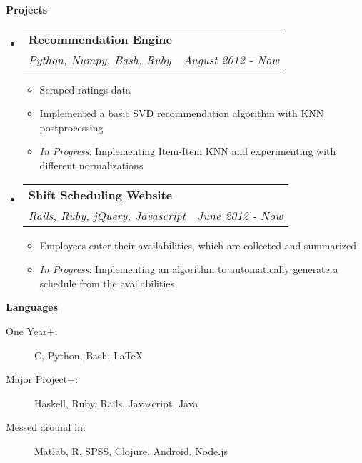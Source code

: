 \documentclass[letterpaper,11pt]{article}
\makeatletter
\newcommand{\resitem}[1]{\item #1 \vspace{-2pt}}
\newcommand{\resheading}[1]{{\large {\textbf{#1 \vphantom{p\^{E}}}}}}
\newcommand{\ressubheading}[4]{
\begin{tabular*}{6.5in}{l@{\extracolsep{\fill}}r}
		\textbf{#1} & #2 \\
			    \textit{#3} & \textit{#4} \\
\end{tabular*}\vspace{-6pt}}
\makeatother
\begin{document}
\resheading{Projects}
\begin{itemize}
\item[]
	\ressubheading{Recommendation Engine}{}{Python, Numpy, Bash, Ruby}{August 2012 - Now}
	\begin{itemize}
		\resitem{Scraped ratings data}
				\resitem{Implemented a basic SVD recommendation algorithm with KNN postprocessing}
						  \resitem{\textit{In Progress}: Implementing Item-Item KNN and experimenting with different normalizations}
								       \end{itemize}

\item[]
	\ressubheading{Shift Scheduling Website}{}{Rails, Ruby, jQuery, Javascript}{June 2012 - Now}
	\begin{itemize}
		\resitem{Employees enter their availabilities, which are collected and summarized}
				  \resitem{\textit{In Progress}: Implementing an algorithm to automatically generate a schedule from the availabilities}
				  \end{itemize}

\end{itemize}

\resheading{Languages}

\begin{description}
\item[One Year+:]
C, Python, Bash, \LaTeX
\item[Major Project+:]
Haskell, Ruby, Rails, Javascript, Java
\item[Messed around in:]
Matlab, R, SPSS, Clojure, Android, Node.js
\end{description}
\end{document}
